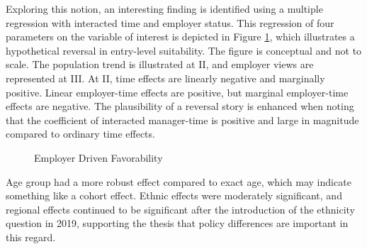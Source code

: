\documentclass[AER]{./aea-latex-templates/AEA}
\begin{document}
        Exploring this notion, an interesting finding is identified using a multiple regression with interacted time and employer status.
        This regression of four parameters on the variable of interest is depicted in
        Figure \ref{fig:employer_driven_favorability}, which illustrates a hypothetical reversal in entry-level
        suitability. The figure is conceptual and not to scale. The population
        trend is illustrated at II, and employer views are represented at III. At II,
        time effects are linearly negative and marginally positive. Linear
        employer-time effects are positive, but marginal employer-time effects are
        negative. The plausibility of a reversal story is enhanced when noting
        that the coefficient of interacted manager-time is positive and large in magnitude compared to ordinary time effects.
        
        \begin{figure}[h!]
            \centering
            \caption{Employer Driven Favorability}
        
        
            \label{fig:employer_driven_favorability}
            \end{figure}
        
        Age group had a more robust effect compared to exact age, which may
        indicate something like a cohort effect. Ethnic effects were moderately
        significant, and regional effects continued to be significant after the
        introduction of the ethnicity question in 2019, supporting the thesis
        that policy differences are important in this regard.
        
\end{document}
